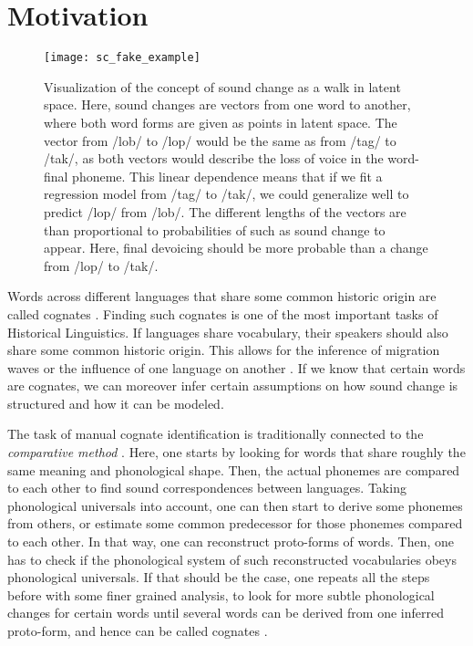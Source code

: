 \documentclass[6pt]{article}
\begin{document}
\section{Motivation}
\label{Motivation}
\begin{figure}[h]
\begin{center}
\texttt{[image: sc\_fake\_example]} 
\caption{Visualization of the concept of sound change as a walk in latent space. Here, sound changes are vectors from one word to another, where both word forms are given as points in latent space. The vector from /lob/ to /lop/ would be the same as from /tag/ to /tak/, as both vectors would describe the loss of voice in the word-final phoneme. This linear dependence means that if we fit a regression model from /tag/ to /tak/, we could generalize well to predict /lop/ from /lob/. The different lengths of the vectors are than proportional to probabilities of such as sound change to appear. Here, final devoicing should be more probable than a change from /lop/ to /tak/. }
\label{fig:final_devoicing}
\end{center}
\end{figure}

Words across different languages that share some common historic origin are called cognates \citep[p. 193]{trask1996historical}. Finding such cognates is one of the most important tasks of Historical Linguistics. If languages share vocabulary, their speakers should also share some common historic origin. This allows for the inference of migration waves \citep{gray2009language,bouckaert2012mapping} or the influence of one language on another \citep{dellert2015uralic}. If we know that certain words are cognates, we can moreover infer certain assumptions on how sound change is structured and how it can be modeled.


The task of manual cognate identification is traditionally connected to the \textit{comparative method} \citep[p. 191ff]{trask1996historical}. Here, one starts by looking for words that share roughly the same meaning and phonological shape. Then, the actual phonemes are compared to each other to find sound correspondences between languages. Taking phonological universals into account, one can then start to derive some phonemes from others, or estimate some common predecessor for those phonemes compared to each other. In that way, one can reconstruct proto-forms of words. Then, one has to check if the phonological system of such reconstructed vocabularies obeys phonological universals. If that should be the case, one repeats all the steps before with some finer grained analysis, to look for more subtle phonological changes
 for certain words until several words can be derived from one inferred proto-form, and hence can be called cognates .  
 
\end{document}
